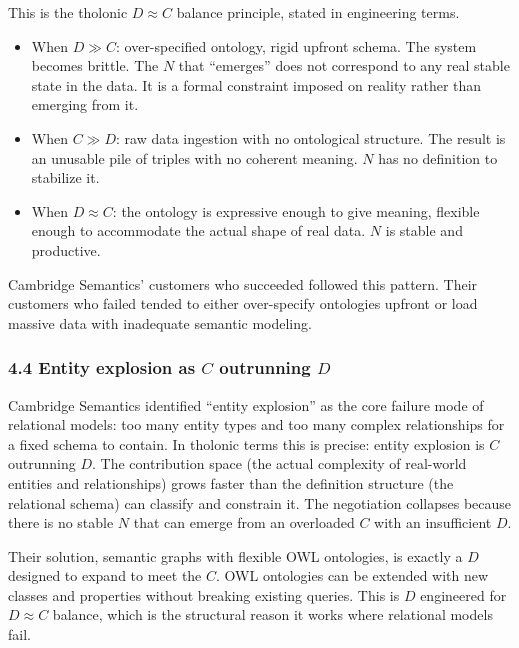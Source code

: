 \documentclass[
  11pt,
  letterpaper,
]{article}
\providecommand{\tightlist}{%
  \setlength{\itemsep}{0pt}\setlength{\parskip}{0pt}}
\begin{document}
This is the tholonic \(D \approx C\) balance principle, stated in
engineering terms.

\begin{itemize}
\tightlist
\item
  When \(D \gg C\): over-specified ontology, rigid upfront schema. The
  system becomes brittle. The \(N\) that ``emerges'' does not correspond
  to any real stable state in the data. It is a formal constraint
  imposed on reality rather than emerging from it.
\item
  When \(C \gg D\): raw data ingestion with no ontological structure.
  The result is an unusable pile of triples with no coherent meaning.
  \(N\) has no definition to stabilize it.
\item
  When \(D \approx C\): the ontology is expressive enough to give
  meaning, flexible enough to accommodate the actual shape of real data.
  \(N\) is stable and productive.
\end{itemize}

Cambridge Semantics' customers who succeeded followed this pattern.
Their customers who failed tended to either over-specify ontologies
upfront or load massive data with inadequate semantic modeling.

\subsubsection{\texorpdfstring{4.4 Entity explosion as \(C\) outrunning
\(D\)}{4.4 Entity explosion as C outrunning D}}\label{entity-explosion-as-c-outrunning-d}

Cambridge Semantics identified ``entity explosion'' as the core failure
mode of relational models: too many entity types and too many complex
relationships for a fixed schema to contain. In tholonic terms this is
precise: entity explosion is \(C\) outrunning \(D\). The contribution
space (the actual complexity of real-world entities and relationships)
grows faster than the definition structure (the relational schema) can
classify and constrain it. The negotiation collapses because there is no
stable \(N\) that can emerge from an overloaded \(C\) with an
insufficient \(D\).

Their solution, semantic graphs with flexible OWL ontologies, is exactly
a \(D\) designed to expand to meet the \(C\). OWL ontologies can be
extended with new classes and properties without breaking existing
queries. This is \(D\) engineered for \(D \approx C\) balance, which is
the structural reason it works where relational models fail.
\end{document}
